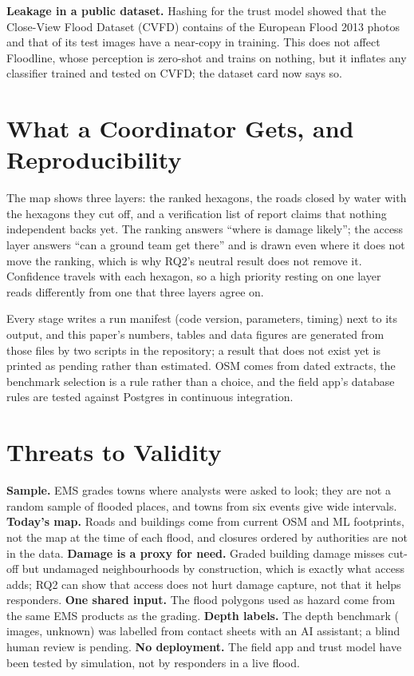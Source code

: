\documentclass[conference]{IEEEtran}
\begin{document}
\textbf{Leakage in a public dataset.} Hashing for the trust model showed that the Close-View Flood Dataset (CVFD) contains \leakEuflood{} of the \trustEufloodN{} European Flood 2013 photos and that \leakTest{} of its \leakTestN{} test images have a near-copy in training. This does not affect Floodline, whose perception is zero-shot and trains on nothing, but it inflates any classifier trained and tested on CVFD; the dataset card now says so.

\section{What a Coordinator Gets, and Reproducibility}

The map shows three layers: the ranked hexagons, the roads closed by water with the hexagons they cut off, and a verification list of report claims that nothing independent backs yet. The ranking answers ``where is damage likely''; the access layer answers ``can a ground team get there'' and is drawn even where it does not move the ranking, which is why RQ2's neutral result does not remove it. Confidence travels with each hexagon, so a high priority resting on one layer reads differently from one that three layers agree on.

Every stage writes a run manifest (code version, parameters, timing) next to its output, and this paper's numbers, tables and data figures are generated from those files by two scripts in the repository; a result that does not exist yet is printed as pending rather than estimated. OSM comes from dated extracts, the benchmark selection is a rule rather than a choice, and the field app's database rules are tested against Postgres in continuous integration.

\section{Threats to Validity}

\textbf{Sample.} EMS grades towns where analysts were asked to look; they are not a random sample of flooded places, and \nTowns{} towns from six events give wide intervals. \textbf{Today's map.} Roads and buildings come from current OSM and ML footprints, not the map at the time of each flood, and closures ordered by authorities are not in the data. \textbf{Damage is a proxy for need.} Graded building damage misses cut-off but undamaged neighbourhoods by construction, which is exactly what access adds; RQ2 can show that access does not hurt damage capture, not that it helps responders. \textbf{One shared input.} The flood polygons used as hazard come from the same EMS products as the grading. \textbf{Depth labels.} The depth benchmark (\depthImages{} images, \depthUnknown{} unknown) was labelled from contact sheets with an AI assistant; a blind human review is pending. \textbf{No deployment.} The field app and trust model have been tested by simulation, not by responders in a live flood.
\end{document}
